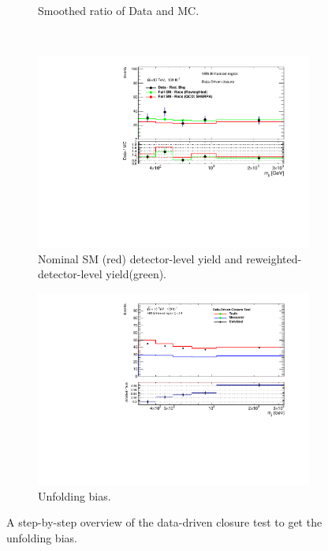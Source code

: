 \begin{figure}[htb]
\begin{subfigure}{.48\textwidth}
        \caption{Smoothed ratio of Data and MC. \label{fig:ddclosure_DataMCSmooth} }
    \end{subfigure}\\
    \begin{subfigure}{.48\textwidth}
        \centering
        \includegraphics[width=.9\linewidth]{figures/Analysis/Unfolding/DDClosure_VBS_Enhanced_Reweighted.pdf}
        \caption{ Nominal SM (red) detector-level yield and reweighted-detector-level yield(green). \label{fig:ddclosure_DataMCReweighted} }
    \end{subfigure}
    \begin{subfigure}{.48\textwidth}
        \centering
        \includegraphics[width=.9\linewidth]{figures/Analysis/Unfolding/DDClosure_VBS_Enhanced_Bias.pdf}
        \caption{Unfolding bias. \label{fig:ddclosure_FinalBias} }
    \end{subfigure}
    \caption{ A step-by-step overview of the data-driven closure test to get the unfolding bias. \label{fig:unfolding_ddclosure}}
\end{figure}
